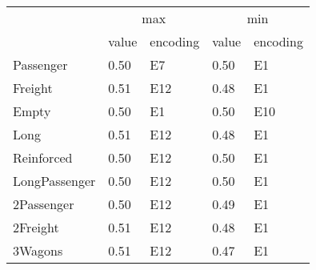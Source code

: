\begin{tabular}{lllll}
\toprule
 & \multicolumn{2}{c}{max} & \multicolumn{2}{c}{min} \\
 & value & encoding & value & encoding \\
\midrule
Passenger & 0.50 & E7 & 0.50 & E1 \\
Freight & 0.51 & E12 & 0.48 & E1 \\
Empty & 0.50 & E1 & 0.50 & E10 \\
Long & 0.51 & E12 & 0.48 & E1 \\
Reinforced & 0.50 & E12 & 0.50 & E1 \\
LongPassenger & 0.50 & E12 & 0.50 & E1 \\
2Passenger & 0.50 & E12 & 0.49 & E1 \\
2Freight & 0.51 & E12 & 0.48 & E1 \\
3Wagons & 0.51 & E12 & 0.47 & E1 \\
\bottomrule
\end{tabular}
